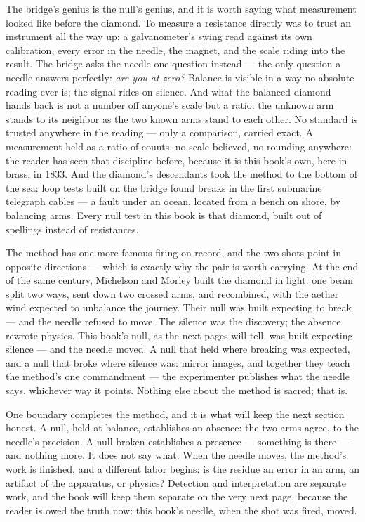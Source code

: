 The bridge's genius is the null's genius, and it is worth saying what measurement
looked like before the diamond. To measure a resistance directly was to trust an
instrument all the way up: a galvanometer's swing read against its own calibration,
every error in the needle, the magnet, and the scale riding into the result. The
bridge asks the needle one question instead --- the only question a needle answers
perfectly: \emph{are you at zero?} Balance is visible in a way no absolute reading
ever is; the signal rides on silence. And what the balanced diamond hands back is
not a number off anyone's scale but a ratio: the unknown arm stands to its neighbor
as the two known arms stand to each other. No standard is trusted anywhere in the
reading --- only a comparison, carried exact. A measurement held as a ratio of
counts, no scale believed, no rounding anywhere: the reader has seen that
discipline before, because it is this book's own, here in brass, in 1833. And the
diamond's descendants took the method to the bottom of the sea: loop tests built
on the bridge found breaks in the first submarine telegraph cables --- a fault
under an ocean, located from a bench on shore, by balancing arms. Every null test
in this book is that diamond, built out of spellings instead of resistances.

The method has one more famous firing on record, and the two shots point in
opposite directions --- which is exactly why the pair is worth carrying. At the end
of the same century, Michelson and Morley built the diamond in light: one beam
split two ways, sent down two crossed arms, and recombined, with the aether wind
expected to unbalance the journey. Their null was built expecting to break --- and
the needle refused to move. The silence was the discovery; the absence rewrote
physics. This book's null, as the next pages will tell, was built expecting
silence --- and the needle moved. A null that held where breaking was expected,
and a null that broke where silence was: mirror images, and together they teach
the method's one commandment --- the experimenter publishes what the needle says,
whichever way it points. Nothing else about the method is sacred; that is.

One boundary completes the method, and it is what will keep the next section
honest. A null, held at balance, establishes an absence: the two arms agree, to
the needle's precision. A null broken establishes a presence --- something is
there --- and nothing more. It does not say what. When the needle moves, the
method's work is finished, and a different labor begins: is the residue an error
in an arm, an artifact of the apparatus, or physics? Detection and interpretation
are separate work, and the book will keep them separate on the very next page,
because the reader is owed the truth now: this book's needle, when the shot was
fired, moved.


